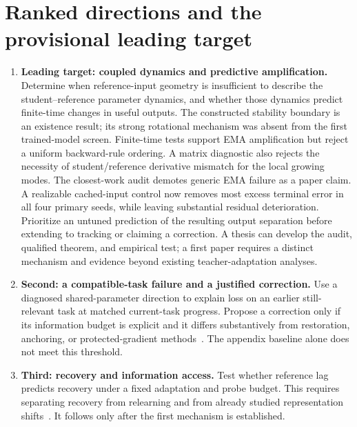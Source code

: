 \documentclass[11pt,a4paper]{article}
\begin{document}
\section{Ranked directions and the provisional leading target}
\begin{enumerate}[leftmargin=*]
\item \textbf{Leading target: coupled dynamics and predictive amplification.}
Determine when reference-input geometry is insufficient to describe the
student--reference parameter dynamics, and whether those dynamics predict
finite-time changes in useful outputs. The constructed stability boundary
is an existence result; its strong rotational mechanism was absent from
the first trained-model screen. Finite-time tests support EMA amplification
but reject a uniform backward-rule ordering. A matrix diagnostic also
rejects the necessity of student/reference derivative mismatch for the
local growing modes. The closest-work audit demotes generic EMA failure
as a paper claim. A realizable cached-input control now removes most
excess terminal error in all four primary seeds, while leaving substantial
residual deterioration. Prioritize an untuned prediction of the resulting
output separation before extending to tracking or claiming a correction. A thesis can develop the audit, qualified theorem, and empirical
test; a first paper requires a distinct mechanism and evidence beyond
existing teacher-adaptation analyses.
\item \textbf{Second: a compatible-task failure and a justified correction.}
Use a diagnosed shared-parameter direction to explain loss on an earlier
still-relevant task at matched current-task progress. Propose a correction
only if its information budget is explicit and it differs substantively
from restoration, anchoring, or protected-gradient methods~\cite{ogd}.
The appendix baseline alone does not meet this threshold.
\item \textbf{Third: recovery and information access.}
Test whether reference lag predicts recovery under a fixed adaptation and
probe budget. This requires separating recovery from relearning and from
already studied representation shifts~\cite{spurious}. It follows only
after the first mechanism is established.
\end{enumerate}
\end{document}

